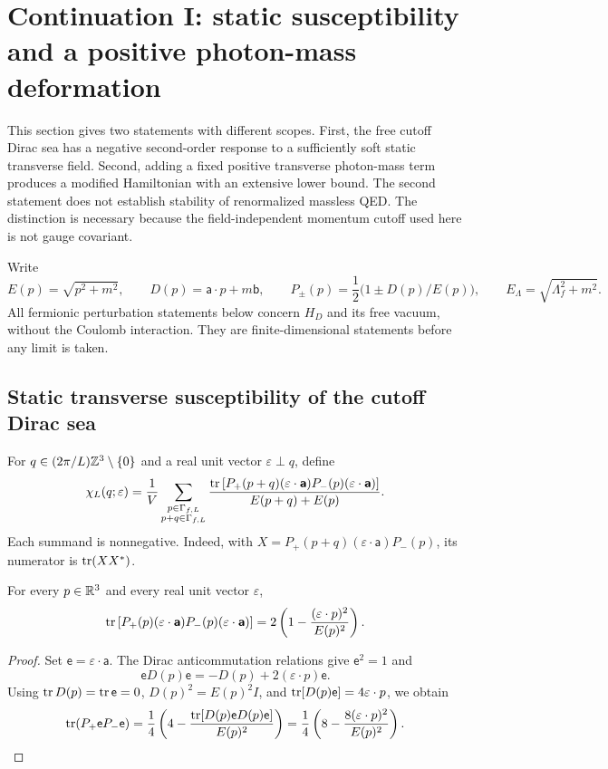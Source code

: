 \section{Continuation I: static susceptibility and a positive photon-mass deformation}
\label{sec:ward}

This section gives two statements with different scopes. First, the free cutoff
Dirac sea has a negative second-order response to a sufficiently soft static
transverse field. Second, adding a fixed positive transverse photon-mass term
produces a modified Hamiltonian with an extensive lower bound. The second
statement does not establish stability of renormalized massless QED. The
distinction is necessary because the field-independent momentum cutoff used
here is not gauge covariant.

Write
\[
 E(p)=\sqrt{p^2+m^2},\qquad
 D(p)=\boldsymbol{\mathsf a}\cdot p+m\mathsf b,\qquad
 P_\pm(p)=\frac12\bigl(1\pm D(p)/E(p)\bigr),\qquad
 E_\Lambda=\sqrt{\Lambda_f^2+m^2}.
\]
All fermionic perturbation statements below concern \(H_D\) and its free
vacuum, without the Coulomb interaction. They are finite-dimensional
statements before any limit is taken.

\subsection{Static transverse susceptibility of the cutoff Dirac sea}

For \(q\in(2\pi/L)\mathbb Z^3\setminus\{0\}\) and a real unit vector
\(\varepsilon\perp q\), define
\begin{equation}
 \chi_L(q;\varepsilon)=\frac1V
 \sum_{\substack{p\in\Gamma_{f,L}\\p+q\in\Gamma_{f,L}}}
 \frac{\operatorname{tr}\left[P_+(p+q)(\varepsilon\cdot\boldsymbol{\mathsf a})
 P_-(p)(\varepsilon\cdot\boldsymbol{\mathsf a})\right]}
 {E(p+q)+E(p)}.
 \label{eq:chiL}
\end{equation}
Each summand is nonnegative. Indeed, with
\(X=P_+(p+q)(\varepsilon\cdot\boldsymbol{\mathsf a})P_-(p)\), its
numerator is \(\operatorname{tr}(XX^*)\).

\begin{lemma}
\label{lem:trace}
For every \(p\in\mathbb R^3\) and every real unit vector \(\varepsilon\),
\begin{equation}
 \operatorname{tr}\left[P_+(p)(\varepsilon\cdot\boldsymbol{\mathsf a})
 P_-(p)(\varepsilon\cdot\boldsymbol{\mathsf a})\right]
 =2\left(1-\frac{(\varepsilon\cdot p)^2}{E(p)^2}\right).
 \label{eq:trace-identity}
\end{equation}
\end{lemma}
\begin{proof}
Set \(\mathsf e=\varepsilon\cdot\boldsymbol{\mathsf a}\). The Dirac
anticommutation relations give \(\mathsf e^2=1\) and
\[
 \mathsf eD(p)\mathsf e=-D(p)+2(\varepsilon\cdot p)\mathsf e.
\]
Using \(\operatorname{tr} D(p)=\operatorname{tr}\mathsf e=0\), \(D(p)^2=E(p)^2I\), and
\(\operatorname{tr}[D(p)\mathsf e]=4\varepsilon\cdot p\), we obtain
\[
 \operatorname{tr}(P_+\mathsf eP_-\mathsf e)
 =\frac14\left(4-\frac{\operatorname{tr}[D(p)\mathsf eD(p)\mathsf e]}{E(p)^2}\right)
 =\frac14\left(8-\frac{8(\varepsilon\cdot p)^2}{E(p)^2}\right).
\]
\end{proof}

